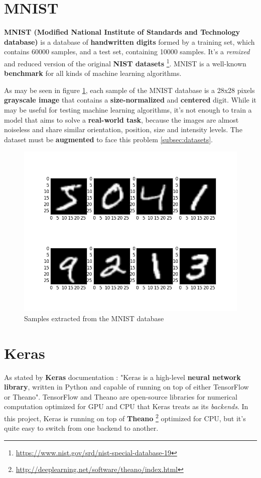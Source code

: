 \section{MNIST}\label{sec:MNIST}
\textbf{MNIST (Modified National Institute of Standards and Technology database)} \cite{lecun-mnisthandwrittendigit-2010} is a database of \textbf{handwritten digits} formed by a training set, which contains 60000 samples, and a test set, containing 10000 samples. It's a \textit{remixed} and reduced version of the original \textbf{NIST datasets} \footnote{\url{https://www.nist.gov/srd/nist-special-database-19}}. MNIST is a well-known \textbf{benchmark} for all kinds of machine learning algorithms.

As may be seen in figure \ref{fig:mnist}, each sample of the MNIST database is a 28x28 pixels \textbf{grayscale image} that contains a \textbf{size-normalized} and \textbf{centered} digit. While it may be useful for testing machine learning algorithms, it's not enough to train a model that aims to solve a \textbf{real-world task}, because the images are almost noiseless and share similar orientation, position, size and intensity levels. The dataset must be \textbf{augmented} to face this problem \ref{subsec:datasets}.
\begin{figure}
	\centering
	\includegraphics[width=12cm, keepaspectratio]{figures/mnist.png}
	\caption{Samples extracted from the MNIST database}
	\label{fig:mnist}
\end{figure}

\section{Keras}\label{sec:keras}
As stated by \textbf{Keras} documentation \cite{chollet2015keras}: "Keras is a high-level \textbf{neural network library}, written in Python and capable of running on top of either TensorFlow or Theano". TensorFlow and Theano are open-source libraries for numerical computation optimized for GPU and CPU that Keras treats as its \textit{backends}. In this project, Keras is running on top of \textbf{Theano} \footnote{\url{http://deeplearning.net/software/theano/index.html}} optimized for CPU, but it's quite easy to switch from one backend to another.

